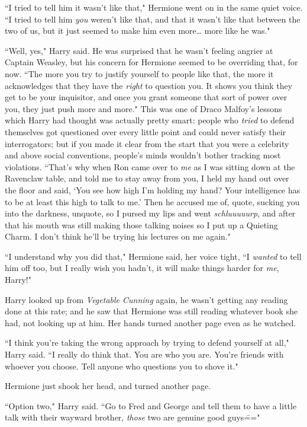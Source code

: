 ``I tried to tell him it wasn't like that," Hermione went on in the same quiet voice. ``I tried to tell him \emph{you} weren't like that, and that it wasn't like that between the two of us, but it just seemed to make him even more{\ldots} more like he was."

``Well, yes," Harry said. He was surprised that he wasn't feeling angrier at Captain Weasley, but his concern for Hermione seemed to be overriding that, for now. ``The more you try to justify yourself to people like that, the more it acknowledges that they have the \emph{right} to question you. It shows you think they get to be your inquisitor, and once you grant someone that sort of power over you, they just push more and more." This was one of Draco Malfoy's lessons which Harry had thought was actually pretty smart: people who \emph{tried} to defend themselves got questioned over every little point and could never satisfy their interrogators; but if you made it clear from the start that you were a celebrity and above social conventions, people's minds wouldn't bother tracking most violations. ``That's why when Ron came over to \emph{me} as I was sitting down at the Ravenclaw table, and told me to stay away from you, I held my hand out over the floor and said, `You see how high I'm holding my hand? Your intelligence has to be at least this high to talk to me.' Then he accused me of, quote, sucking you into the darkness, unquote, so I pursed my lips and went \emph{schluuuuurp}, and after that his mouth was still making those talking noises so I put up a Quieting Charm. I don't think he'll be trying his lectures on me again."

``I understand why you did that," Hermione said, her voice tight, ``I \emph{wanted} to tell him off too, but I really wish you hadn't, it will make things harder for \emph{me}, Harry!"

Harry looked up from \emph{Vegetable Cunning} again, he wasn't getting any reading done at this rate; and he saw that Hermione was still reading whatever book she had, not looking up at him. Her hands turned another page even as he watched.

``I think you're taking the wrong approach by trying to defend yourself at all," Harry said. ``I really do think that. You are who you are. You're friends with whoever you choose. Tell anyone who questions you to shove it."

Hermione just shook her head, and turned another page.

``Option two," Harry said. ``Go to Fred and George and tell them to have a little talk with their wayward brother, \emph{those} two are genuine good guys\==="

